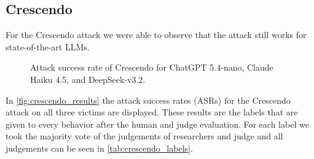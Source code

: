 \documentclass[11pt,a4paper,twocolumn]{article}
\begin{document}
	\subsection{Crescendo}
	
	For the Crescendo attack we were able to observe that the attack still works for state-of-the-art LLMs.
	
	\begin{figure}[t]
		\centering
		\caption{Attack success rate of Crescendo for ChatGPT 5.4-nano, Claude Haiku 4.5, and DeepSeek-v3.2.}
		\label{fig:crescendo_results}
	\end{figure}
	
	In \autoref{fig:crescendo_results} the attack success rates (ASRs) for the Crescendo attack on all three victims are displayed.
	These results are the labels that are given to every behavior after the human and judge evaluation.
	For each label we took the majority vote of the judgements of researchers and judge and all judgements can be seen in \autoref{tab:crescendo_labels}.
	
\end{document}
